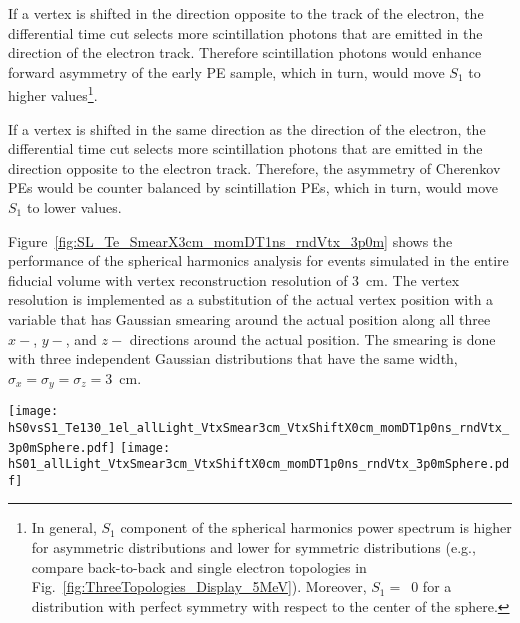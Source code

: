 If a vertex is shifted in the direction opposite to the track of the electron, the differential time cut selects more scintillation 
photons that are emitted in the direction of the electron track. Therefore scintillation photons would enhance forward asymmetry of the early PE
sample, which in turn, would move $S_1$ to higher values\footnote{In general, $S_1$ component of the
spherical harmonics power spectrum is higher for asymmetric distributions and lower for symmetric distributions (e.g., compare back-to-back
and single electron topologies in Fig.~\ref{fig:ThreeTopologies_Display_5MeV}). Moreover, $S_1=$~0 for a distribution with perfect symmetry
with respect to the center of the sphere.}.

If a vertex is shifted in the same direction as the direction of the electron, the differential time cut selects more scintillation
photons that are emitted in the direction opposite to the electron track. Therefore, the asymmetry of Cherenkov PEs would be counter
balanced by scintillation PEs, which in turn, would move $S_1$ to lower values.

Figure~\ref{fig:SL_Te_SmearX3cm_momDT1ns_rndVtx_3p0m} shows the performance of the spherical harmonics analysis for events simulated
in the entire fiducial volume with vertex reconstruction resolution of 3~cm. The vertex resolution is implemented
as a substitution of the actual vertex position with a variable that has Gaussian smearing around the actual position along all three
$x-$, $y-$, and $z-$ directions around the actual position. The smearing is done with three independent 
Gaussian distributions that have the same width, $\sigma_x = \sigma_y = \sigma_z =$3~cm.

\begin{figure*}[h]
  \centering
  \texttt{[image: hS0vsS1\_Te130\_1el\_allLight\_VtxSmear3cm\_VtxShiftX0cm\_momDT1p0ns\_rndVtx\_3p0mSphere.pdf]}
  \texttt{[image: hS01\_allLight\_VtxSmear3cm\_VtxShiftX0cm\_momDT1p0ns\_rndVtx\_3p0mSphere.pdf]}
  \caption{\emph{Left:} Scatter plot of $S_0$ versus $S_1$ for a simulation of 1000 signal (\emph{red crosses}) and background
    (\emph{blue triangles}) events. Event verticies are uniformly distributed within the fiducial volume, $R<3$~m.
    Vertex is smeared with 3~cm resolution. Differential cut of
    $\Delta t=t^{phot}_{measured} - t^{phot}_{predicted}<$1~ns is applied to select early PE sample.
    The default QE and 100\% photo-coverage is used in the simulation.
    Black dashed line corresponds to a linear fit to define 1-D variable $S_{01}$ (see text for details).
    \emph{Right:} Comparison of the $S_{01}$ distribution between signal (\emph{red solid line}) and background (\emph{blue dashed line}).}
\label{fig:SL_Te_SmearX3cm_momDT1ns_rndVtx_3p0m}
\end{figure*}

